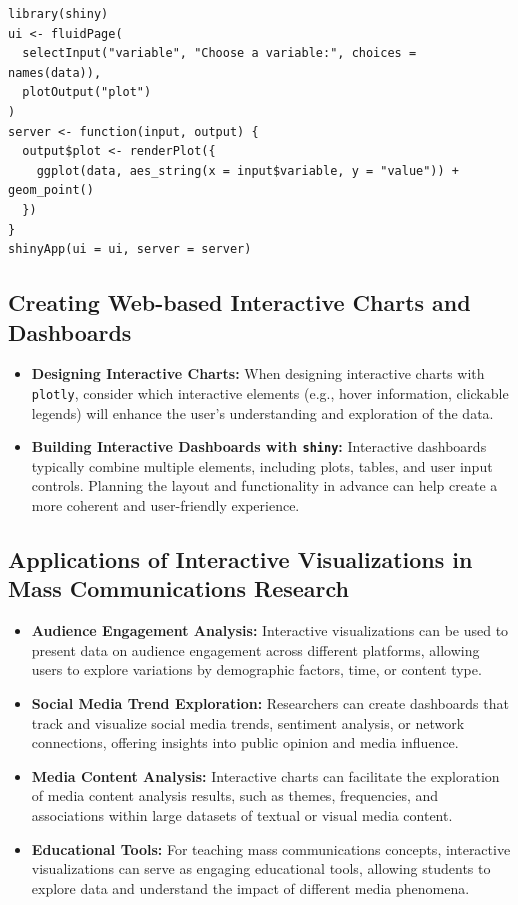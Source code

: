 \documentclass[
]{book}
\begin{document}
\begin{verbatim}
library(shiny)
ui <- fluidPage(
  selectInput("variable", "Choose a variable:", choices = names(data)),
  plotOutput("plot")
)
server <- function(input, output) {
  output$plot <- renderPlot({
    ggplot(data, aes_string(x = input$variable, y = "value")) + geom_point()
  })
}
shinyApp(ui = ui, server = server)
\end{verbatim}

\hypertarget{creating-web-based-interactive-charts-and-dashboards}{%
\subsection{Creating Web-based Interactive Charts and Dashboards}\label{creating-web-based-interactive-charts-and-dashboards}}

\begin{itemize}
\item
  \textbf{Designing Interactive Charts:} When designing interactive charts with \texttt{plotly}, consider which interactive elements (e.g., hover information, clickable legends) will enhance the user's understanding and exploration of the data.
\item
  \textbf{Building Interactive Dashboards with \texttt{shiny}:} Interactive dashboards typically combine multiple elements, including plots, tables, and user input controls. Planning the layout and functionality in advance can help create a more coherent and user-friendly experience.
\end{itemize}

\hypertarget{applications-of-interactive-visualizations-in-mass-communications-research}{%
\subsection{Applications of Interactive Visualizations in Mass Communications Research}\label{applications-of-interactive-visualizations-in-mass-communications-research}}

\begin{itemize}
\item
  \textbf{Audience Engagement Analysis:} Interactive visualizations can be used to present data on audience engagement across different platforms, allowing users to explore variations by demographic factors, time, or content type.
\item
  \textbf{Social Media Trend Exploration:} Researchers can create dashboards that track and visualize social media trends, sentiment analysis, or network connections, offering insights into public opinion and media influence.
\item
  \textbf{Media Content Analysis:} Interactive charts can facilitate the exploration of media content analysis results, such as themes, frequencies, and associations within large datasets of textual or visual media content.
\item
  \textbf{Educational Tools:} For teaching mass communications concepts, interactive visualizations can serve as engaging educational tools, allowing students to explore data and understand the impact of different media phenomena.
\end{itemize}
\end{document}
